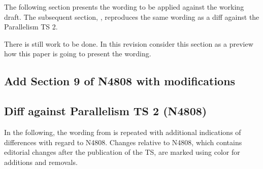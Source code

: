 The following section presents the wording to be applied against the \CC{}
working draft.
The subsequent section, , reproduces the same wording as a diff
against the Parallelism TS 2.

There is still work to be done.
In this revision consider this section as a preview how this paper is going to
present the wording.

\subsection{Add Section 9 of N4808 with modifications}\label{sec:wording}

\begin{wgText}
  \def\wgRem#1{}
  \def\wgItemAdd{\item}
  \newsavebox{\wgVoid}
  \def\wgAdd#1{#1}
  \def\wgChange#1#2{#2}
  \def\diffbreak#1{}
  \setcounter{WGClause}{28}
  \setcounter{WGSubSection}{8}
  
\end{wgText}

\subsection{Diff against Parallelism TS 2 (N4808)}\label{sec:diff}

In the following, the wording from  is repeated with additional indications of differences with regard to N4808.
Changes relative to N4808, which contains editorial changes after the publication of the TS, are marked using color for \textcolor{WgAdd}{additions} and \textcolor{WgRem}{removals}.

\def\wgLabelPrefix{diff}%
\begin{wgText}
  \setcounter{WGClause}{28}
  \setcounter{WGSubSection}{8}
  \makeatletter
  \let\@tmp@seebelow=\seebelow
  \def\seebelow{\mbox{\@tmp@seebelow}}
  \let\@tmp@impdef=\impdef
  \def\impdef{\mbox{\@tmp@impdef}}
    \newcount\diffbreak@count
    \def\diffbreak#1{
      \\\diffbreak@count=\z@%
      \hbox{\@whilenum\diffbreak@count<#1\do{\ \advance\diffbreak@count\@ne}}%
    }
  \makeatother
  
\end{wgText}
